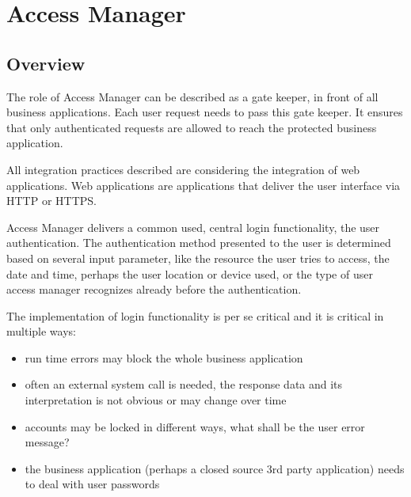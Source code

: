 
\chapter{Access Manager}


\section{Overview}

The role of Access Manager can be described as a gate keeper, in front
of all business applications. Each user request needs to pass this gate
keeper. It ensures that only authenticated requests are allowed to reach
the protected business application.

\begin{framed}

    All integration practices described are considering the integration
    of web applications. Web applications are applications that deliver 
    the user interface via HTTP or HTTPS\@.

\end{framed}

Access Manager delivers a common used, central login functionality, the
user authentication. The authentication method presented to the user is
determined based on several input parameter, like the resource the user
tries to access, the date and time, perhaps the user location or device
used, or the type of user access manager recognizes already
before the authentication.

The implementation of login functionality is per se critical and it is
critical in multiple ways:

\begin{itemize}

    \item run time errors may block the whole business application

    \item often an external system call is needed, the response data 
        and its interpretation is not obvious or may change over time

    \item accounts may be locked in different ways, what shall be the 
        user error message?

    \item the business application (perhaps a closed source 3rd party
        application) needs to deal with user passwords

\end{itemize}

